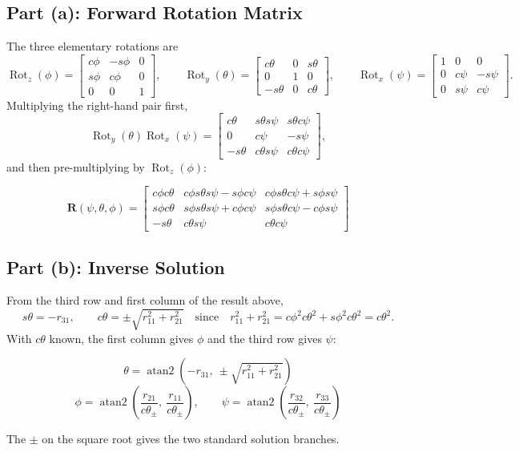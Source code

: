 \documentclass[11pt]{article}
\newcommand{\R}{\bm{R}}
\newcommand{\Rotx}{\operatorname{Rot}_x}
\newcommand{\Roty}{\operatorname{Rot}_y}
\newcommand{\Rotz}{\operatorname{Rot}_z}
\newcommand{\atantwo}{\operatorname{atan2}}
\begin{document}
\subsection*{Part (a): Forward Rotation Matrix}
The three elementary rotations are
\[
    \Rotz(\phi) = \begin{bmatrix}c\phi & -s\phi & 0\\ s\phi & c\phi & 0\\ 0 & 0 & 1\end{bmatrix},\qquad
    \Roty(\theta) = \begin{bmatrix}c\theta & 0 & s\theta\\ 0 & 1 & 0\\ -s\theta & 0 & c\theta\end{bmatrix},\qquad
    \Rotx(\psi) = \begin{bmatrix}1 & 0 & 0\\ 0 & c\psi & -s\psi\\ 0 & s\psi & c\psi\end{bmatrix}.
\]
Multiplying the right-hand pair first,
\[
    \Roty(\theta)\Rotx(\psi) = \begin{bmatrix}
        c\theta & s\theta s\psi & s\theta c\psi\\
        0 & c\psi & -s\psi\\
        -s\theta & c\theta s\psi & c\theta c\psi
    \end{bmatrix},
\]
and then pre-multiplying by $\Rotz(\phi)$:
\begin{result}
\[
    \R(\psi,\theta,\phi) = \begin{bmatrix}
        c\phi c\theta & c\phi s\theta s\psi - s\phi c\psi & c\phi s\theta c\psi + s\phi s\psi\\
        s\phi c\theta & s\phi s\theta s\psi + c\phi c\psi & s\phi s\theta c\psi - c\phi s\psi\\
        -s\theta & c\theta s\psi & c\theta c\psi
    \end{bmatrix}
\]
\end{result}

\subsection*{Part (b): Inverse Solution}
From the third row and first column of the result above,
\[
    s\theta = -r_{31}, \qquad
    c\theta = \pm\sqrt{r_{11}^{2}+r_{21}^{2}}
    \quad\text{since}\quad
    r_{11}^{2}+r_{21}^{2} = c\phi^{2}c\theta^{2}+s\phi^{2}c\theta^{2} = c\theta^{2}.
\]
With $c\theta$ known, the first column gives $\phi$ and the third row gives $\psi$:
\begin{result}
\[
    \theta = \atantwo\!\left(-r_{31},\ \pm\sqrt{r_{11}^{2}+r_{21}^{2}}\right)
\]
\[
    \phi = \atantwo\!\left(\frac{r_{21}}{c\theta_{\pm}},\ \frac{r_{11}}{c\theta_{\pm}}\right),
    \qquad
    \psi = \atantwo\!\left(\frac{r_{32}}{c\theta_{\pm}},\ \frac{r_{33}}{c\theta_{\pm}}\right)
\]
\end{result}
The $\pm$ on the square root gives the two standard solution branches.
\end{document}
